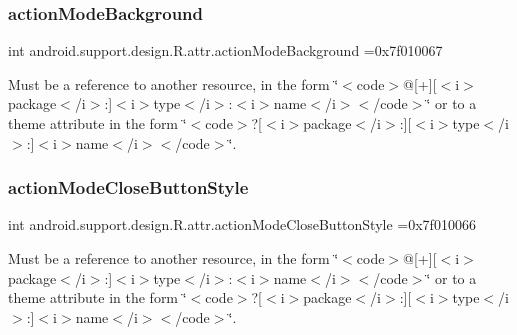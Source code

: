 \subsubsection{\texorpdfstring{action\+Mode\+Background}{actionModeBackground}}
{\footnotesize\ttfamily int android.\+support.\+design.\+R.\+attr.\+action\+Mode\+Background =0x7f010067\hspace{0.3cm}{\ttfamily [static]}}

Must be a reference to another resource, in the form \char`\"{}$<$code$>$@\mbox{[}+\mbox{]}\mbox{[}$<$i$>$package$<$/i$>$\+:\mbox{]}$<$i$>$type$<$/i$>$\+:$<$i$>$name$<$/i$>$$<$/code$>$\char`\"{} or to a theme attribute in the form \char`\"{}$<$code$>$?\mbox{[}$<$i$>$package$<$/i$>$\+:\mbox{]}\mbox{[}$<$i$>$type$<$/i$>$\+:\mbox{]}$<$i$>$name$<$/i$>$$<$/code$>$\char`\"{}. \mbox{\label{classandroid_1_1support_1_1design_1_1R_1_1attr_af2fceeea8a5606613dd831df4b13e4e9}} 
\subsubsection{\texorpdfstring{action\+Mode\+Close\+Button\+Style}{actionModeCloseButtonStyle}}
{\footnotesize\ttfamily int android.\+support.\+design.\+R.\+attr.\+action\+Mode\+Close\+Button\+Style =0x7f010066\hspace{0.3cm}{\ttfamily [static]}}

Must be a reference to another resource, in the form \char`\"{}$<$code$>$@\mbox{[}+\mbox{]}\mbox{[}$<$i$>$package$<$/i$>$\+:\mbox{]}$<$i$>$type$<$/i$>$\+:$<$i$>$name$<$/i$>$$<$/code$>$\char`\"{} or to a theme attribute in the form \char`\"{}$<$code$>$?\mbox{[}$<$i$>$package$<$/i$>$\+:\mbox{]}\mbox{[}$<$i$>$type$<$/i$>$\+:\mbox{]}$<$i$>$name$<$/i$>$$<$/code$>$\char`\"{}. \mbox{\label{classandroid_1_1support_1_1design_1_1R_1_1attr_a9cced00fc0348684dc2d08ec0bcf9dad}} 
